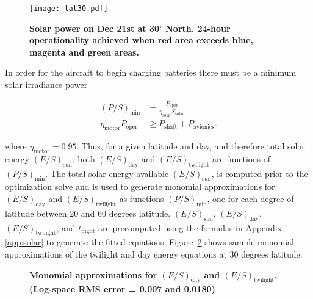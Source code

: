 \begin{figure}[h!]
	\begin{center}
	\texttt{[image: lat30.pdf]}
    \caption{\textbf{Solar power on Dec 21st at 30$^{\circ}$ North. 24-hour operationality achieved when red area exceeds blue, magenta and green areas. }}
	\label{f:lat30}
	\end{center}
\end{figure}

In order for the aircraft to begin charging batteries there must be a minimum solar irradiance power

\begin{align}
    (P/S)_{\text{min}} &= \frac{P_{\text{oper}}}{\eta_{\text{solar}} S_{\text{solar}}} \\
    \eta_{\text{motor}} P_{\text{oper}} &\geq P_{\text{shaft}} + P_{\text{avionics}}.
\end{align}

where $\eta_{\text{motor}} = 0.95$. 
Thus, for a given latitude and day, and therefore total solar energy $(E/S)_{\text{sun}}$, both $(E/S)_{\text{day}}$ and $(E/S)_{\text{twilight}}$ are functions of $(P/S)_{\text{min}}$.  
The total solar energy available $(E/S)_{\text{sun}}$, is computed prior to the optimization solve and is used to generate monomial approximations for $(E/S)_{\text{day}}$ and $(E/S)_{\text{twilight}}$ as functions $(P/S)_{\text{min}}$, one for each degree of latitude between 20 and 60 degrees latitude. 
$(E/S)_{\text{sun}}$, $(E/S)_{\text{day}}$, $(E/S)_{\text{twilight}}$, and $t_{\text{night}}$ are precomputed using the formulas in Appendix \ref{app:solar} to generate the fitted equations. 
Figure~\ref{f:energyapprox} shows sample monomial approximations of the twilight and day energy equations at 30 degrees latitude. 

\begin{figure}[H]
 \begin{subfigmatrix}{2}%
 \end{subfigmatrix}
 \caption{\textbf{Monomial approximations for $(E/S)_{\text{day}}$ and $(E/S)_{\text{twilight}}$. (Log-space RMS error = 0.007 and 0.0180)}}
 \label{f:energyapprox}
\end{figure}


